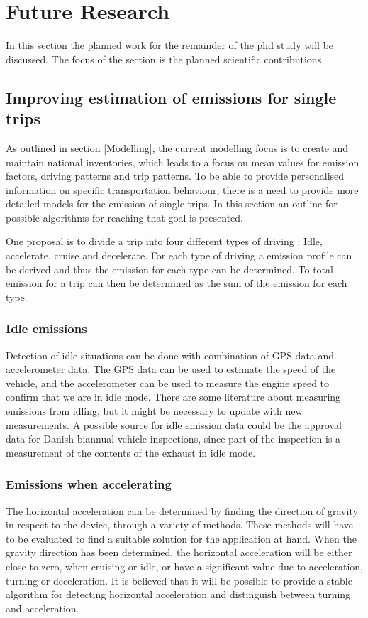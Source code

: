 \section{Future Research}\label{futurework}
In this section the planned work for the remainder of the phd study will be discussed. The focus of the section is the planned scientific contributions.

\subsection{Improving estimation of emissions for single trips}
As outlined in section \ref{Modelling}, the current modelling focus is to create and maintain national inventories, which leads to a focus on mean values for emission factors, driving patterns and trip patterns. To be able to provide personalised information on specific transportation behaviour, there is a need to provide more detailed models for the emission of single trips. In this section an outline for possible algorithms for reaching that goal is presented.

One proposal is to divide a trip into four different types of driving : Idle, accelerate, cruise and decelerate. For each type of driving a emission profile can be derived and thus the emission for each type can be determined. To total emission for a trip can then be determined as the sum of the emission for each type.

\subsubsection{Idle emissions}\label{Idle}
Detection of idle situations can be done with combination of GPS data and accelerometer data. The GPS data can be used to estimate the speed of the vehicle, and the accelerometer can be used to measure the engine speed to confirm that we are in idle mode. There are some literature about measuring emissions from idling, but it might be necessary to update with new measurements. A possible source for idle emission data could be the approval data for Danish biannual vehicle inspections, since part of the inspection is a measurement of the contents of the exhaust in idle mode.

\subsubsection{Emissions when accelerating}
The horizontal acceleration can be determined by finding the direction of gravity in respect to the device, through a variety of methods. These methods will have to be evaluated to find a suitable solution for the application at hand.
When the gravity direction has been determined, the horizontal acceleration will be either close to zero, when cruising or idle, or have a significant value due to acceleration, turning or deceleration. It is believed that it will be possible to provide a stable algorithm for detecting horizontal acceleration and distinguish between turning and acceleration.

